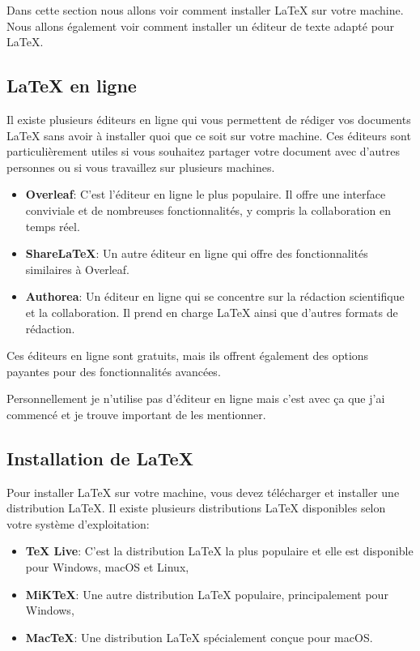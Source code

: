 Dans cette section nous allons voir comment installer LaTeX sur votre machine.
Nous allons également voir comment installer un éditeur de texte adapté pour LaTeX.

\subsection{LaTeX en ligne}\label{subsec:latex_online}

Il existe plusieurs éditeurs en ligne qui vous permettent de rédiger vos documents LaTeX sans avoir à installer quoi que ce soit sur votre machine.
Ces éditeurs sont particulièrement utiles si vous souhaitez partager votre document avec d'autres personnes ou si vous travaillez sur plusieurs machines.

\begin{itemize}
    \item \textbf{Overleaf}: C'est l'éditeur en ligne le plus populaire. 
    Il offre une interface conviviale et de nombreuses fonctionnalités, y compris la collaboration en temps réel.
    \item \textbf{ShareLaTeX}: Un autre éditeur en ligne qui offre des fonctionnalités similaires à Overleaf.
    \item \textbf{Authorea}: Un éditeur en ligne qui se concentre sur la rédaction scientifique et la collaboration. 
    Il prend en charge LaTeX ainsi que d'autres formats de rédaction.
\end{itemize}

Ces éditeurs en ligne sont gratuits, mais ils offrent également des options payantes pour des fonctionnalités avancées.

Personnellement je n'utilise pas d'éditeur en ligne mais c'est avec ça que j'ai commencé et je
trouve important de les mentionner.

\subsection{Installation de LaTeX}\label{subsec:latex_installation}

Pour installer LaTeX sur votre machine, vous devez télécharger et installer une distribution LaTeX.
Il existe plusieurs distributions LaTeX disponibles selon votre système d'exploitation:

\begin{itemize}
    \item \textbf{TeX Live}: C'est la distribution LaTeX la plus populaire et elle est disponible pour Windows, macOS et Linux,
    \item \textbf{MiKTeX}: Une autre distribution LaTeX populaire, principalement pour Windows,
    \item \textbf{MacTeX}: Une distribution LaTeX spécialement conçue pour macOS.
\end{itemize}

